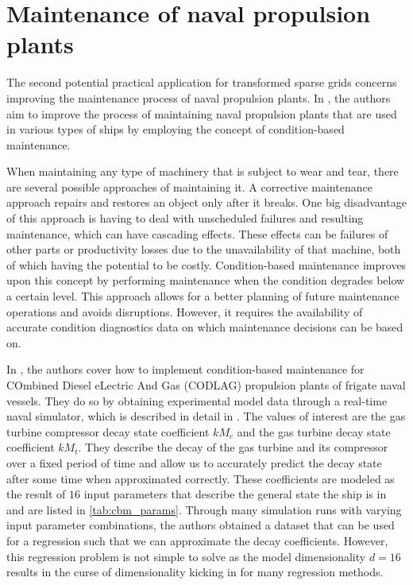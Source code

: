 \documentclass[
  a4paper,  %
  twoside,  %
  bibliography=totoc,
  headsepline,
  cleardoublepage=empty,
  parskip=half,
  draft=false
]{scrbook}
\begin{document}
\section{Maintenance of naval propulsion plants}

The second potential practical application for transformed sparse grids concerns improving the maintenance process of naval propulsion plants.
In \cite{Coraddu2016}, the authors aim to improve the process of maintaining naval propulsion plants that are used in various types of ships by employing the concept of condition-based maintenance.

When maintaining any type of machinery that is subject to wear and tear, there are several possible approaches of maintaining it.
A corrective maintenance approach repairs and restores an object only after it breaks.
One big disadvantage of this approach is having to deal with unscheduled failures and resulting maintenance, which can have cascading effects.
These effects can be failures of other parts or productivity losses due to the unavailability of that machine, both of which having the potential to be costly.
Condition-based maintenance improves upon this concept by performing maintenance when the condition degrades below a certain level.
This approach allows for a better planning of future maintenance operations and avoids disruptions.
However, it requires the availability of accurate condition diagnostics data on which maintenance decisions can be based on.

In \cite{Coraddu2016}, the authors cover how to implement condition-based maintenance for COmbined Diesel eLectric And Gas (CODLAG) propulsion plants of frigate naval vessels.
They do so by obtaining experimental model data through a real-time naval simulator, which is described in detail in \cite{Altosole2009}.
The values of interest are the gas turbine compressor decay state coefficient $kM_c$ and the gas turbine decay state coefficient $kM_t$.
They describe the decay of the gas turbine and its compressor over a fixed period of time and allow us to accurately predict the decay state after some time when approximated correctly.
These coefficients are modeled as the result of $16$ input parameters that describe the general state the ship is in and are listed in \cref{tab:cbm_params}.
Through many simulation runs with varying input parameter combinations, the authors obtained a dataset that can be used for a regression such that we can approximate the decay coefficients.
However, this regression problem is not simple to solve as the model dimensionality $d=16$ results in the curse of dimensionality kicking in for many regression methods.
\end{document}
